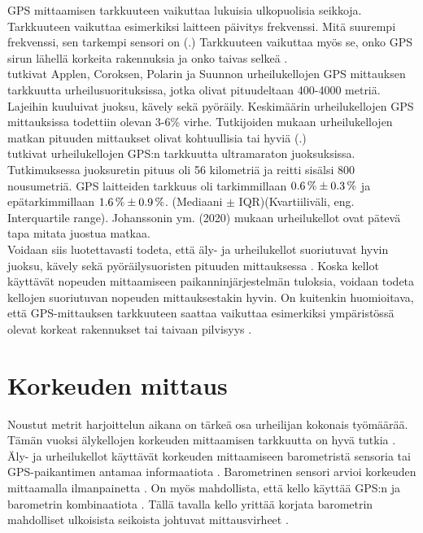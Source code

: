 \documentclass[utf8,bachelor,finnish]{bachelor}
\begin{document}
  GPS mittaamisen tarkkuuteen vaikuttaa lukuisia ulkopuolisia seikkoja. Tarkkuuteen vaikuttaa esimerkiksi laitteen päivitys frekvenssi.
   Mitä suurempi frekvenssi, sen tarkempi sensori on (\cite{cummins_global_2013}.) Tarkkuuteen vaikuttaa myös
    se, onko GPS sirun lähellä korkeita rakennuksia ja onko taivas selkeä \parencite{baranski_enhancing_2012}. \\

  \textcite{gilgen-ammann_accuracy_2020} tutkivat Applen, Coroksen, Polarin ja Suunnon urheilukellojen GPS mittauksen tarkkuutta urheilusuorituksissa, jotka olivat
    pituudeltaan  400-4000 metriä. Lajeihin kuuluivat juoksu, kävely sekä pyöräily. Keskimäärin urheilukellojen GPS mittauksissa todettiin olevan 3-6\% virhe.
    Tutkijoiden mukaan urheilukellojen matkan pituuden mittaukset olivat kohtuullisia tai hyviä (\cite{gilgen-ammann_accuracy_2020}.)\\

  \textcite{johansson_accuracy_2020} tutkivat urheilukellojen GPS:n tarkkuutta ultramaraton juoksuksissa. Tutkimuksessa juoksuretin pituus oli 56 kilometriä ja reitti sisälsi 800 nousumetriä.
    GPS laitteiden tarkkuus oli tarkimmillaan $\SI{0.6 \pm 0.3}{\percent}$ ja epätarkimmillaan $ \SI{1.6 \pm 0.9}{\percent} $. (Mediaani $\pm$ IQR)(Kvartiiliväli, eng. Interquartile range).
     Johanssonin ym. (2020) mukaan urheilukellot ovat pätevä tapa mitata juostua matkaa.\\

  Voidaan siis luotettavasti todeta, että äly- ja urheilukellot suoriutuvat hyvin juoksu, kävely sekä pyöräilysuoristen pituuden mittauksessa \parencite{gilgen-ammann_accuracy_2020,johansson_accuracy_2020}.
   Koska kellot käyttävät nopeuden mittaamiseen paikanninjärjestelmän tuloksia, voidaan todeta kellojen suoriutuvan nopeuden mittauksestakin hyvin. On kuitenkin huomioitava,
    että GPS-mittauksen tarkkuuteen saattaa vaikuttaa esimerkiksi ympäristössä olevat korkeat rakennukset tai taivaan pilvisyys \parencite{baranski_enhancing_2012}.

  \section{Korkeuden mittaus}
    Noustut metrit harjoittelun aikana on tärkeä osa urheilijan kokonais työmäärää. Tämän vuoksi älykellojen korkeuden mittaamisen tarkkuutta on hyvä tutkia \parencite{ammann_accuracy_2016}.
     Äly- ja urheilukellot käyttävät korkeuden mittaamiseen barometristä sensoria tai GPS-paikantimen antamaa informaatiota \parencite{ammann_accuracy_2016}.
      Barometrinen sensori arvioi korkeuden mittaamalla ilmanpainetta \parencite{aroganam2019review}.
       On myös mahdollista, että kello käyttää GPS:n ja barometrin kombinaatiota \parencite{aroganam2019review}. Tällä tavalla kello yrittää korjata barometrin mahdolliset ulkoisista seikoista
        johtuvat mittausvirheet \parencite{aroganam2019review}.\\
        
\end{document}
